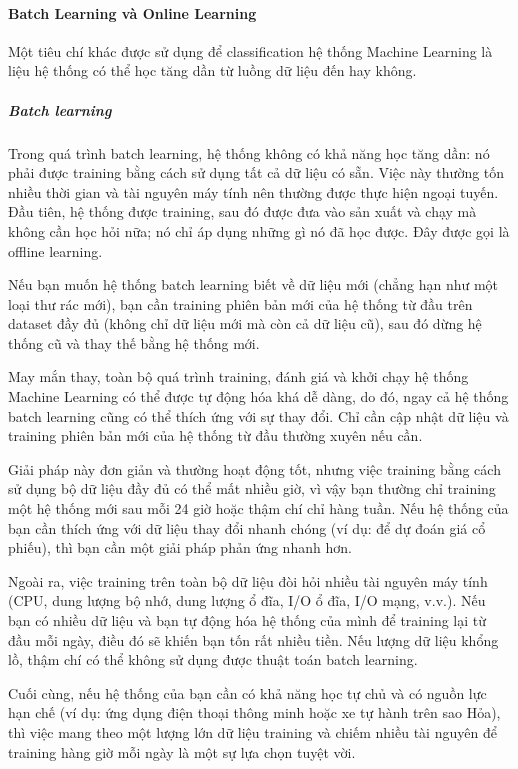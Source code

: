 \paragraph{Batch Learning và Online Learning}

Một tiêu chí khác được sử dụng để classification hệ thống Machine Learning là liệu hệ thống có thể học tăng dần từ luồng dữ liệu đến hay không.

\subparagraph{Batch learning}

Trong quá trình batch learning, hệ thống không có khả năng học tăng dần: nó phải được training bằng cách sử dụng tất cả dữ liệu có sẵn. Việc này thường tốn nhiều thời gian và tài nguyên máy tính nên thường được thực hiện ngoại tuyến. Đầu tiên, hệ thống được training, sau đó được đưa vào sản xuất và chạy mà không cần học hỏi nữa; nó chỉ áp dụng những gì nó đã học được. Đây được gọi là offline learning.

Nếu bạn muốn hệ thống batch learning biết về dữ liệu mới (chẳng hạn như một loại thư rác mới), bạn cần training phiên bản mới của hệ thống từ đầu trên dataset đầy đủ (không chỉ dữ liệu mới mà còn cả dữ liệu cũ), sau đó dừng hệ thống cũ và thay thế bằng hệ thống mới.

May mắn thay, toàn bộ quá trình training, đánh giá và khởi chạy hệ thống Machine Learning có thể được tự động hóa khá dễ dàng, do đó, ngay cả hệ thống batch learning cũng có thể thích ứng với sự thay đổi. Chỉ cần cập nhật dữ liệu và training phiên bản mới của hệ thống từ đầu thường xuyên nếu cần.

Giải pháp này đơn giản và thường hoạt động tốt, nhưng việc training bằng cách sử dụng bộ dữ liệu đầy đủ có thể mất nhiều giờ, vì vậy bạn thường chỉ training một hệ thống mới sau mỗi 24 giờ hoặc thậm chí chỉ hàng tuần. Nếu hệ thống của bạn cần thích ứng với dữ liệu thay đổi nhanh chóng (ví dụ: để dự đoán giá cổ phiếu), thì bạn cần một giải pháp phản ứng nhanh hơn.

Ngoài ra, việc training trên toàn bộ dữ liệu đòi hỏi nhiều tài nguyên máy tính (CPU, dung lượng bộ nhớ, dung lượng ổ đĩa, I/O ổ đĩa, I/O mạng, v.v.). Nếu bạn có nhiều dữ liệu và bạn tự động hóa hệ thống của mình để training lại từ đầu mỗi ngày, điều đó sẽ khiến bạn tốn rất nhiều tiền. Nếu lượng dữ liệu khổng lồ, thậm chí có thể không sử dụng được thuật toán batch learning.

Cuối cùng, nếu hệ thống của bạn cần có khả năng học tự chủ và có nguồn lực hạn chế (ví dụ: ứng dụng điện thoại thông minh hoặc xe tự hành trên sao Hỏa), thì việc mang theo một lượng lớn dữ liệu training và chiếm nhiều tài nguyên để training hàng giờ mỗi ngày là một sự lựa chọn tuyệt vời.

